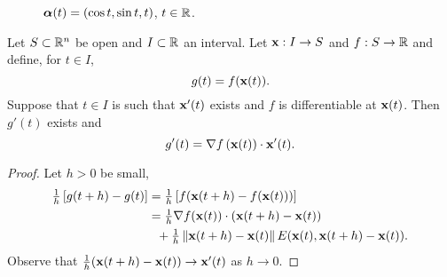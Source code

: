 \begin{figure}[htb]
    \begin{center}
        \caption{\(\boldsymbol{\alpha}(t)=(\cos t, \sin t, t)\), \(t\in \mathbb{R}\).}
    \end{center}
\end{figure}


\begin{theorem*}
    Let \(S\subset \mathbb{R}^n\) be open and \(I\subset \mathbb{R}\) an interval.
    Let \(\mathbf{x}: I \to S\) and \(f:S \to \mathbb{R}\) and define, for \(t\in I\),
    \[
        g(t) = f (\mathbf{x}(t)).
    \]
    Suppose that  \(t\in I\) is such that \(\mathbf{x}'(t)\) exists and \(f\) is differentiable at \(\mathbf{x}(t)\).
    Then \(g'(t)\) exists and
    \[
        g'(t) = \nabla f \left(\mathbf{x}(t)\right) \cdot \mathbf{x}'(t).
    \]
\end{theorem*}


\begin{proof}
    Let \(h>0\) be small, \vspace{-.5em}
    \[
        \begin{aligned}
            \tfrac{1}{h}\left[g(t+h)-g(t) \right]
             & = \tfrac{1}{h}\left[f(\mathbf{x}(t+h)-f(\mathbf{x}(t)))\right]                        \\
             & = \tfrac{1}{h} \nabla f(\mathbf{x}(t))\cdot (\mathbf{x}(t+h)-\mathbf{x}(t))                  \\
             & \ \ +  \tfrac{1}{h}  \left\|\mathbf{x}(t+h)-\mathbf{x}(t)\right\| E(\mathbf{x}(t), \mathbf{x}(t+h)-\mathbf{x}(t)).
        \end{aligned}
    \]
    Observe that \(\tfrac{1}{h}  (\mathbf{x}(t+h)-\mathbf{x}(t)) \to \mathbf{x}'(t)  \) as \(h\to 0\).
\end{proof}


